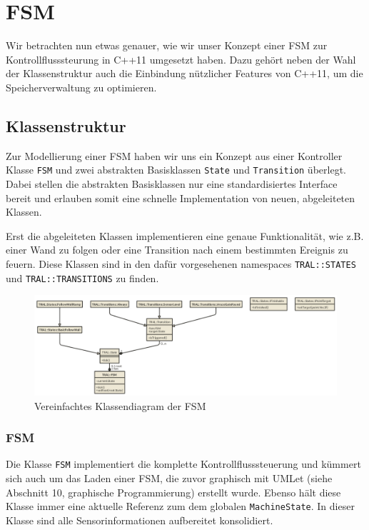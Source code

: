 \section{FSM}
\label{sec:fsm}
Wir betrachten nun etwas genauer, wie wir unser Konzept einer FSM zur 
Kontrollflusssteurung in C++11 umgesetzt haben. Dazu gehört neben der Wahl 
der Klassenstruktur auch die Einbindung nützlicher Features von C++11, um die
Speicherverwaltung zu optimieren.


\subsection{Klassenstruktur}
Zur Modellierung einer FSM haben wir uns ein Konzept aus einer Kontroller Klasse \texttt{FSM} und zwei abstrakten Basisklassen \texttt{State} und \texttt{Transition} überlegt. Dabei stellen die abstrakten Basisklassen nur eine standardisiertes Interface bereit und erlauben somit eine schnelle Implementation von neuen, abgeleiteten Klassen.


Erst die abgeleiteten Klassen implementieren eine genaue Funktionalität, wie z.B. einer Wand zu folgen oder eine Transition nach einem bestimmten Ereignis zu feuern. Diese Klassen sind in den dafür vorgesehenen namespaces \texttt{TRAL::STATES} und \texttt{TRAL::TRANSITIONS} zu finden.

\begin{figure}[htbp] 
  \centering
     \includegraphics[width=\textwidth]{images/fsm-uml.png}
  \caption{Vereinfachtes Klassendiagram der FSM}
  \label{fig:KlassendiagramFSM}
\end{figure}

\subsubsection{FSM}
Die Klasse \texttt{FSM} implementiert die komplette Kontrollflusssteuerung und kümmert sich auch um das Laden einer FSM, die zuvor graphisch mit UMLet (siehe Abschnitt 10, graphische Programmierung) erstellt wurde. Ebenso hält diese Klasse immer eine aktuelle Referenz zum dem globalen \texttt{MachineState}. In dieser Klasse sind alle Sensorinformationen aufbereitet konsolidiert.

